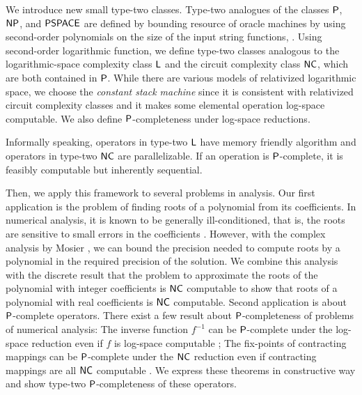 \documentclass[envcountsame,orivec,oribibl]{llncs}
\begin{document}
We introduce new small type-two classes.
Type-two analogues of the classes $\mathsf{P}$, $\mathsf{NP}$, and $\mathsf{PSPACE}$
are defined by bounding resource of oracle machines by using 
second-order polynomials on the size of the input string functions,
\cite{kawamura2012complexity}.
Using second-order logarithmic function,
we define type-two classes analogous to the logarithmic-space 
complexity class $\mathsf{L}$ and the circuit complexity class $\mathsf{NC}$, 
which are both contained in $\mathsf{P}$.
While there are various models of relativized logarithmic space,
we choose the \emph{constant stack machine} \cite{aehlig2007relativizing} 
since it is consistent with relativized circuit complexity classes 
and it makes some elemental operation log-space computable.
We also define $\mathsf{P}$-completeness under log-space reductions.

Informally speaking, operators in type-two $\mathsf{L}$ have
memory friendly algorithm and operators in type-two $\mathsf{NC}$
are parallelizable.
If an operation is $\mathsf{P}$-complete,
it is feasibly computable but inherently sequential. 

Then, we apply this framework to several problems in analysis.
Our first application is the problem of finding roots of a polynomial 
from its coefficients.
In numerical analysis, it is known to be generally ill-conditioned, 
that is, the roots are sensitive to 
small errors in the coefficients \cite{wilkinson1963rounding}.
However, with the complex analysis by Mosier \cite{mosier1986root},
we can bound the precision needed to compute
roots by a polynomial in the required precision of the solution.
We combine this analysis with the discrete result 
that the problem to approximate the roots of the polynomial with integer 
coefficients is $\mathsf{NC}$ computable \cite{neff1994specified}
to show that roots of a polynomial with real coefficients
is $\mathsf{NC}$ computable.
Second application is about $\mathsf{P}$-complete operators.
There exist a few result about $\mathsf{P}$-completeness of problems of numerical analysis:
The inverse function $f^{-1}$ can be $\mathsf{P}$-complete under the log-space
reduction even if $f$ is log-space computable \cite{ko1983computational};
The fix-points of contracting mappings can be $\mathsf{P}$-complete under the
$\mathsf{NC}$ reduction even if contracting mappings are all $\mathsf{NC}$ computable \cite{hoover1991real}.
We express these theorems in constructive way and
show type-two $\mathsf{P}$-completeness of these operators.
\end{document}
